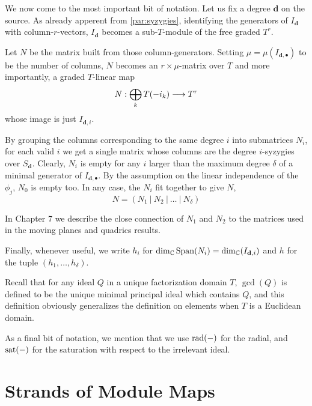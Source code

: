 \documentclass[fleqn,reqno]{amsart}
\numberwithin{first}{chapter}
\begin{document}
\begin{paragraf}
\label{par:N-matrix}
We now come to the most important bit of notation.
Let us fix a degree $\mathbf d$ on the source.
As already apperent from \eqref{par:syzygies},
identifying the generators of $I_{\mathbf d}$ with column-$r$-vectors,
$I_{\mathbf d}$ becomes a sub-$T$-module of the free graded $T^r$.

Let $N$ be the matrix built from those column-generators.
Setting $\mu=\mu(I_{\mathbf d,\bullet})$ to be the number of columns,
$N$ becomes an $r\times\mu$-matrix over $T$
and more importantly, a graded $T$-linear map
\[
N:\bigoplus_{k} T(-i_k)\longrightarrow T^r
\]
whose image is just $I_{\mathbf d,i}$.

By grouping the columns corresponding to the same degree $i$ into submatrices $N_i$,
for each valid $i$ we get a single matrix whose columns are the degree $i$-syzygies over $S_{\mathbf d}$.
Clearly, $N_i$ is empty for any $i$ larger than the maximum degree $\delta$ of a minimal generator
of $I_{\mathbf d,\bullet}$.
By the assumption on the linear independence of the $\phi_j$, $N_0$ is empty too.
In any case, the $N_i$ fit together to give $N$,
\[
	N=(N_1~|~N_2~|~\ldots~|~N_\delta)
\]

In Chapter 7 we describe the close connection of $N_1$ and $N_2$ to the matrices used in
the moving planes and quadrics results.

Finally, whenever useful, we write $h_i$ for $\dim_{\mathbb{C}} \operatorname{Span} (N_i)=\dim_{\mathbb{C}}(I_{\mathbf d,i})$
and $h$ for the tuple $(h_1,\ldots,h_\delta)$.
\end{paragraf}

\begin{paragraf}
Recall that for any ideal $Q$ in a unique factorization domain $T$,
$\gcd(Q)$ is defined to be the unique minimal principal ideal which contains $Q$,
and this definition obviously generalizes the definition on elements
when $T$ is a Euclidean domain.
\end{paragraf}

\begin{paragraf}
As a final bit of notation, we mention that we use $\operatorname{rad}(-)$ for the radial,
and $\operatorname{sat}(-)$ for the saturation with respect to the irrelevant ideal.
\end{paragraf}



\section{Strands of Module Maps}
\end{document}
